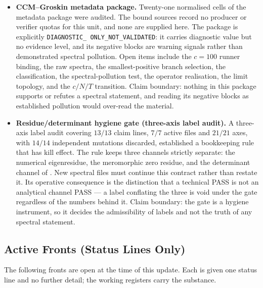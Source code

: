 \documentclass[12pt,a4paper]{article}
\theoremstyle{definition}
\theoremstyle{remark}
\begin{document}
\begin{itemize}
  \item \textbf{CCM--Groskin metadata package.} Twenty-one normalised
    cells of the metadata package were audited. The bound sources record no
    producer or verifier quotas for this unit, and none are supplied here.
    The package is explicitly \texttt{DIAGNOSTIC\_\allowbreak
    ONLY\_\allowbreak NOT\_\allowbreak VALIDATED}: it carries diagnostic
    value but no evidence level, and its negative blocks are warning
    signals rather than demonstrated spectral pollution. Open items include
    the $c = 100$ runner binding, the raw spectra, the smallest-positive
    branch selection, the classification, the spectral-pollution test, the
    operator realisation, the limit topology, and the $c/N/T$ transition.
    Claim boundary: nothing in this package supports or refutes a spectral
    statement, and reading its negative blocks as established pollution
    would over-read the material.

  \item \textbf{Residue/determinant hygiene gate (three-axis label
    audit).} A three-axis label audit covering $13/13$ claim lines, $7/7$
    active files and $21/21$ axes, with $14/14$ independent mutations
    discarded, established a bookkeeping rule that has kill effect. The
    rule keeps three channels strictly separate: the numerical
    eigenresidue, the meromorphic zero residue, and the determinant channel
    of . New spectral files must continue this
    contract rather than restate it. Its operative consequence is the
    distinction that a technical PASS is not an analytical channel PASS ---
    a label conflating the three is void under the gate regardless of the
    numbers behind it. Claim boundary: the gate is a hygiene instrument, so
    it decides the admissibility of labels and not the truth of any
    spectral statement.
\end{itemize}

\subsection{Active Fronts (Status Lines Only)}
\label{sec:v32-fronts}

The following fronts are open at the time of this update. Each is given one
status line and no further detail; the working registers carry the
substance.
\end{document}
